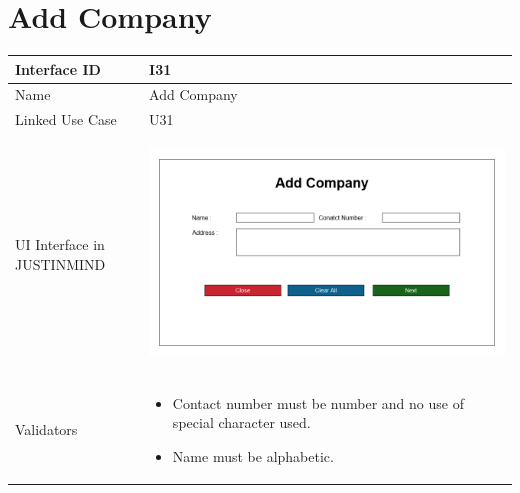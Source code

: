 \documentclass[12pt,a4paper]{report}
\begin{document}
\section{Add Company}

\begin{tabular}{ | m{3cm} | m{12cm}| } \hline

Interface ID & I31  \\\hline

Name  &Add Company\\ \hline

Linked Use Case & U31	 \\ \hline

UI Interface in JUSTINMIND & \begin{center} \includegraphics[scale=0.3]{./User Interface/UI-033 Add Company @1x.png}\end{center}  \\ \hline

Validators & 
\begin{itemize}
\item   Contact number must be number and no use of special character used. 
\item   Name must be alphabetic. 
\end{itemize}
\\ \hline
\end{tabular}

\end{document}
